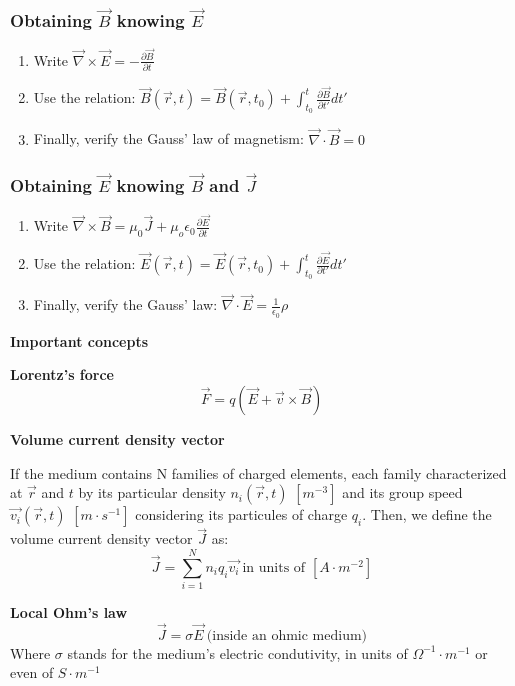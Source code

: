\documentclass[11pt]{article}
\theoremstyle{definition}
\begin{document}
\subsubsection{Obtaining $\vec{B}$ knowing $\vec{E}$}
\begin{enumerate}[label=(\roman*)]
    \item Write $\vec{\nabla} \times \vec{E} = -\frac{\partial \vec{B}}{\partial t}$
    \item Use the relation: $\vec{B}(\vec{r},t) = \vec{B}(\vec{r},t_0) + \int_{t_0}^{t} \frac{\partial \vec{B}}{\partial t'}dt'$
    \item Finally, verify the Gauss' law of magnetism: $\vec{\nabla} \cdot \vec{B} = 0$
\end{enumerate}

\subsubsection{Obtaining $\vec{E}$ knowing $\vec{B}$ and $\vec{J}$}
\begin{enumerate}[label=(\roman*)]
    \item Write $\vec{\nabla} \times \vec{B} = \mu_0 \vec{J} + \mu_o \epsilon_0 \frac{\partial \vec{E}}{\partial t}$
    \item Use the relation: $\vec{E}(\vec{r},t) = \vec{E}(\vec{r},t_0) + \int_{t_0}^{t} \frac{\partial \vec{E}}{\partial t'}dt'$
    \item Finally, verify the Gauss' law: $\vec{\nabla} \cdot \vec{E} = \frac{1}{\epsilon_{0}}\rho$
\end{enumerate}

\begin{shaded}
\textbf{Important concepts}

    \textbf{Lorentz's force}
    \begin{equation}
        \vec{F} = q\left(\vec{E}+\vec{v} \times \vec{B}\right)
    \end{equation}

    \textbf{Volume current density vector}
    
    If the medium contains N families of charged elements, each family characterized at $\vec{r}$ and $t$ by its particular
    density $n_{i}\left(\vec{r},t\right)$ $[m^{-3}]$ and its group speed $\vec{v_{i}}(\vec{r},t)$ $[m\cdot s^{-1}]$ considering its particules of charge $q_{i}$.
    Then, we define the volume current density vector $\vec{J}$ as:
    \begin{equation}
        \vec{J} = \sum_{i=1}^{N} n_{i}q_{i}\vec{v_{i}}\ \text{in units of $[A\cdot m^{-2}]$}
    \end{equation}

    \textbf{Local Ohm's law}
    \begin{equation}
        \vec{J} = \sigma \vec{E}\ \text{(inside an ohmic medium)}
    \end{equation}
    Where $\sigma$ stands for the medium's electric condutivity, in units of $\Omega^{-1} \cdot m^{-1}$ or even of $S \cdot m^{-1}$
\end{shaded}
\end{document}
